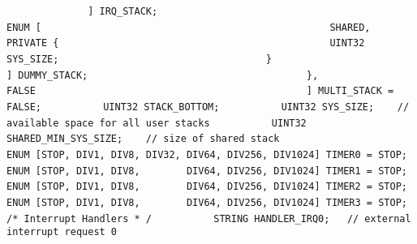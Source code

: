 {{{{\lstinline!              ] IRQ_STACK;                           ! \newline
\lstinline!              ENUM [                                 ! \newline
\lstinline!                SHARED,                              ! \newline
\lstinline!                PRIVATE {                            ! \newline
\lstinline!                  UINT32 SYS_SIZE;                   ! \newline
\lstinline!                }                                    ! \newline
\lstinline!              ] DUMMY_STACK;                         ! \newline
\lstinline!            },                                       ! \newline
\lstinline!            FALSE                                    ! \newline
\lstinline!          ] MULTI_STACK = FALSE;! \newline
\newline
\lstinline!          UINT32 STACK_BOTTOM;! \newline
\newline
\lstinline!          UINT32 SYS_SIZE;    // available space for all user stacks! \newline
\lstinline!          UINT32 SHARED_MIN_SYS_SIZE;    // size of shared stack! \newline
\lstinline!          ! \newline
\lstinline!          ENUM [STOP, DIV1, DIV8, DIV32, DIV64, DIV256, DIV1024] TIMER0 = STOP;! \newline
\lstinline!          ENUM [STOP, DIV1, DIV8,        DIV64, DIV256, DIV1024] TIMER1 = STOP;! \newline
\lstinline!          ENUM [STOP, DIV1, DIV8,        DIV64, DIV256, DIV1024] TIMER2 = STOP;! \newline
\lstinline!          ENUM [STOP, DIV1, DIV8,        DIV64, DIV256, DIV1024] TIMER3 = STOP;! \newline
\lstinline!	  ! \newline
\lstinline!	  ! \newline
\lstinline!! \newline
\lstinline!          /* Interrupt Handlers * /! \newline
\lstinline!          STRING HANDLER_IRQ0;	// external interrupt request 0! \newline
}}}}
